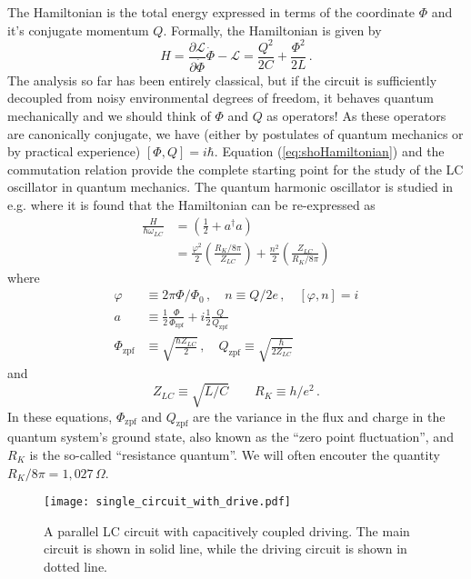 The Hamiltonian is the total energy expressed in terms of the coordinate $\Phi$ and it's conjugate momentum $Q$.
Formally, the Hamiltonian is given by
\begin{equation}
  H
  = \frac{\partial \mathcal{L}}{\partial \dot{\Phi}} \dot{\Phi} - \mathcal{L}
  = \frac{Q^2}{2C} + \frac{\Phi^2}{2L} \, . \label{eq:shoHamiltonian}
\end{equation}
The analysis so far has been entirely classical, but if the circuit is sufficiently decoupled from noisy environmental degrees of freedom, it behaves quantum mechanically and we should think of $\Phi$ and $Q$ as operators!
As these operators are canonically conjugate, we have (either by postulates of quantum mechanics or by practical experience) $[\Phi,Q]=i\hbar$.
Equation (\ref{eq:shoHamiltonian}) and the commutation relation provide the complete starting point for the study of the LC oscillator in quantum mechanics.
The quantum harmonic oscillator is studied in e.g. \citeinternaltype {} where it is found that the Hamiltonian can be re-expressed as
\begin{align}
  \frac{H}{\hbar \omega_{LC}}
  &= \left( \frac{1}{2} + a^\dagger a \right) \nonumber \\
  &= \frac{\varphi^2}{2} \left( \frac{R_K / 8 \pi}{Z_{LC}} \right)
   + \frac{n^2}{2} \left( \frac{Z_{LC}}{R_K / 8 \pi} \right)
\end{align}
where
\begin{align}
  \varphi &\equiv 2 \pi \Phi / \Phi_0 \, , \quad n \equiv Q / 2e \, , \quad [\varphi, n] = i \\
  a &\equiv
      \frac{1}{2} \frac{\Phi}{\Phi_\text{zpf}}
  + i \frac{1}{2} \frac{Q}{Q_\text{zpf}} \\
  \Phi_\text{zpf} &\equiv \sqrt{\frac{\hbar Z_{LC}}{2}} \, , \quad
  Q_\text{zpf} \equiv \sqrt{\frac{\hbar}{2 Z_{LC}}}
\end{align}
and
\begin{equation}
  Z_{LC} \equiv \sqrt{L/C} \qquad R_K \equiv h/e^2 \, .
\end{equation}
In these equations, $\Phi_\text{zpf}$ and $Q_\text{zpf}$ are the variance in the flux and charge in the quantum system's ground state, also known as the ``zero point fluctuation'', and $R_K$ is the so-called ``resistance quantum''.
We will often encouter the quantity $R_K / 8 \pi = 1,027 \, \Omega$.

\begin{figure}
\begin{centering}
\texttt{[image: single\_circuit\_with\_drive.pdf]} 
\par\end{centering}
  \caption{A parallel LC circuit with capacitively coupled driving. The main circuit is shown in solid line, while the driving circuit is shown in dotted line.}
\label{Fig:singleCircuit}
\end{figure}


